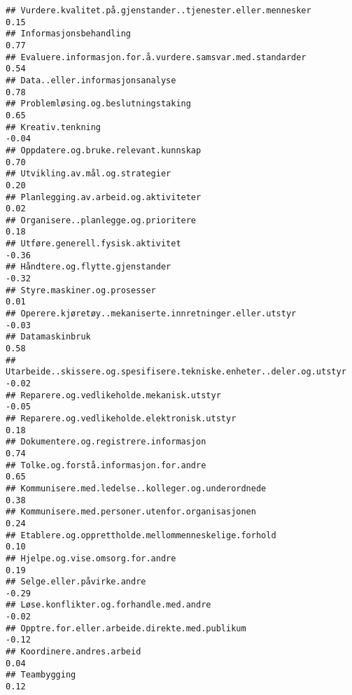 \documentclass[
]{article}
\begin{document}
\begin{verbatim}
## Vurdere.kvalitet.på.gjenstander..tjenester.eller.mennesker                        0.15
## Informasjonsbehandling                                                            0.77
## Evaluere.informasjon.for.å.vurdere.samsvar.med.standarder                         0.54
## Data..eller.informasjonsanalyse                                                   0.78
## Problemløsing.og.beslutningstaking                                                0.65
## Kreativ.tenkning                                                                 -0.04
## Oppdatere.og.bruke.relevant.kunnskap                                              0.70
## Utvikling.av.mål.og.strategier                                                    0.20
## Planlegging.av.arbeid.og.aktiviteter                                              0.02
## Organisere..planlegge.og.prioritere                                               0.18
## Utføre.generell.fysisk.aktivitet                                                 -0.36
## Håndtere.og.flytte.gjenstander                                                   -0.32
## Styre.maskiner.og.prosesser                                                       0.01
## Operere.kjøretøy..mekaniserte.innretninger.eller.utstyr                          -0.03
## Datamaskinbruk                                                                    0.58
## Utarbeide..skissere.og.spesifisere.tekniske.enheter..deler.og.utstyr             -0.02
## Reparere.og.vedlikeholde.mekanisk.utstyr                                         -0.05
## Reparere.og.vedlikeholde.elektronisk.utstyr                                       0.18
## Dokumentere.og.registrere.informasjon                                             0.74
## Tolke.og.forstå.informasjon.for.andre                                             0.65
## Kommunisere.med.ledelse..kolleger.og.underordnede                                 0.38
## Kommunisere.med.personer.utenfor.organisasjonen                                   0.24
## Etablere.og.opprettholde.mellommenneskelige.forhold                               0.10
## Hjelpe.og.vise.omsorg.for.andre                                                   0.19
## Selge.eller.påvirke.andre                                                        -0.29
## Løse.konflikter.og.forhandle.med.andre                                           -0.02
## Opptre.for.eller.arbeide.direkte.med.publikum                                    -0.12
## Koordinere.andres.arbeid                                                          0.04
## Teambygging                                                                       0.12

\end{verbatim}
\end{document}
